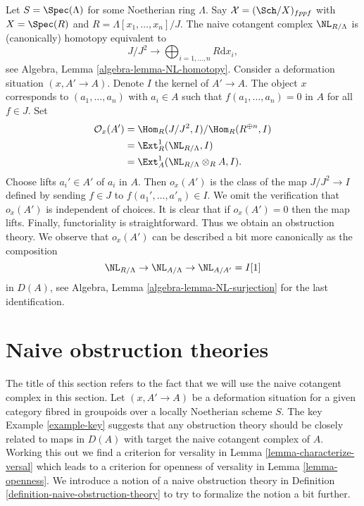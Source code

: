 \begin{example}
\label{example-key}
Let $S = \Spec(\Lambda)$ for some Noetherian ring $\Lambda$.
Say $\mathcal{X} = (\Sch/X)_{fppf}$ with $X = \Spec(R)$ and
$R = \Lambda[x_1, \ldots, x_n]/J$. The naive cotangent
complex $\NL_{R/\Lambda}$ is (canonically) homotopy equivalent to
$$
J/J^2
\longrightarrow
\bigoplus\nolimits_{i = 1, \ldots, n} R\text{d}x_i,
$$
see Algebra, Lemma \ref{algebra-lemma-NL-homotopy}.
Consider a deformation situation $(x, A' \to A)$. Denote $I$ the kernel of
$A' \to A$. The object $x$ corresponds to $(a_1, \ldots, a_n)$
with $a_i \in A$ such that $f(a_1, \ldots, a_n) = 0$ in $A$ for all $f \in J$.
Set
\begin{align*}
\mathcal{O}_x(A')
& =
\Hom_R(J/J^2, I)/\Hom_R(R^{\oplus n}, I) \\
& =
\Ext^1_R(\NL_{R/\Lambda}, I) \\
& =
\Ext^1_A(\NL_{R/\Lambda} \otimes_R A, I).
\end{align*}
Choose lifts $a_i' \in A'$ of $a_i$ in $A$. Then $o_x(A')$
is the class of the map $J/J^2 \to I$ defined by sending $f \in J$ to
$f(a_1', \ldots, a'_n) \in I$. We omit the verification that
$o_x(A')$ is independent of choices. It is clear that if $o_x(A') = 0$
then the map lifts. Finally, functoriality is straightforward.
Thus we obtain an obstruction theory. We observe that $o_x(A')$
can be described a bit more canonically as the composition
$$
\NL_{R/\Lambda} \to \NL_{A/\Lambda} \to \NL_{A/A'} = I[1]
$$
in $D(A)$, see Algebra, Lemma \ref{algebra-lemma-NL-surjection}
for the last identification.
\end{example}









\section{Naive obstruction theories}
\label{section-naive-obstruction-theory}

\noindent
The title of this section refers to the fact that we will use the
naive cotangent complex in this section. Let $(x, A' \to A)$
be a deformation situation for a given category fibred in groupoids over a
locally Noetherian scheme $S$. The key Example \ref{example-key}
suggests that any obstruction theory should be closely related to
maps in $D(A)$ with target the naive cotangent complex of $A$.
Working this out we find a criterion for versality in
Lemma \ref{lemma-characterize-versal} which leads to a criterion for
openness of versality in Lemma \ref{lemma-openness}. We introduce a notion of
a naive obstruction theory in
Definition \ref{definition-naive-obstruction-theory} to try to formalize
the notion a bit further.

